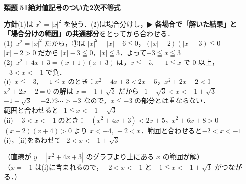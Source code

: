 \documentclass[a4paper,11pt]{ltjsarticle}
\newcommand{\ans}[2]{\Needspace{5\baselineskip}\vspace{6pt}%
  {\sffamily\bfseries 類題 #1\quad #2}\par}
\newcommand{\point}[1]{\textsf{\bfseries ▶ #1}}
\newcommand{\ax}[4]{\draw[->] (#1,0)--(#2,0) node[right]{\scriptsize $x$};
  \draw[->] (0,#3)--(0,#4) node[above]{\scriptsize $y$};
  \node[below left] at (0,0){\scriptsize O};}
\begin{document}
\ans{51}{絶対値記号のついた2次不等式}
\begin{kai}
\textbf{方針}\quad (1)は $x^2=|x|^2$ を使う．(2)は場合分けし，\point{各場合で「解いた結果」と「場合分けの範囲」の共通部分}をとってから合わせる．\\[2pt]
(1)\ $x^2=|x|^2$ だから，①は $|x|^2-|x|-6\leqq0$，\quad $(|x|+2)(|x|-3)\leqq0$\\
\hspace*{1.5em}$|x|+2>0$ だから $|x|-3\leqq0$，\quad $|x|\leqq3$．\quad よって\quad $-3\leqq x\leqq3$\\[2pt]
(2)\ $x^2+4x+3=(x+1)(x+3)$ は，$x\leqq-3,\ -1\leqq x$ で $0$ 以上，$-3<x<-1$ で負．\\[2pt]
\hspace*{1.5em}(i)\ $x\leqq-3,\ -1\leqq x$ のとき：$x^2+4x+3<2x+5$，\quad $x^2+2x-2<0$\\
\hspace*{3em}$x^2+2x-2=0$ の解は $x=-1\pm\sqrt3$ だから\quad $-1-\sqrt3<x<-1+\sqrt3$\\
\hspace*{3em}$-1-\sqrt3=-2.73\cdots>-3$ なので，$x\leqq-3$ の部分とは重ならない．\\
\hspace*{3em}範囲と合わせると\quad $-1\leqq x<-1+\sqrt3$\\
\hspace*{1.5em}(ii)\ $-3<x<-1$ のとき：$-(x^2+4x+3)<2x+5$，\quad $x^2+6x+8>0$\\
\hspace*{3em}$(x+2)(x+4)>0$ より $x<-4,\ -2<x$．範囲と合わせると\quad $-2<x<-1$\\[2pt]
\hspace*{1.5em}(i)，(ii)をあわせて\quad $-2<x<-1+\sqrt3$\\
\begin{center}
\end{center}
\hspace*{1.5em}（直線が $y=|x^2+4x+3|$ のグラフより上にある $x$ の範囲が解）\\
\hspace*{1.5em}（$x=-1$ は(i)に含まれるので，$-2<x<-1$ と $-1\leqq x<-1+\sqrt3$ がつながる．）
\end{kai}
\end{document}
